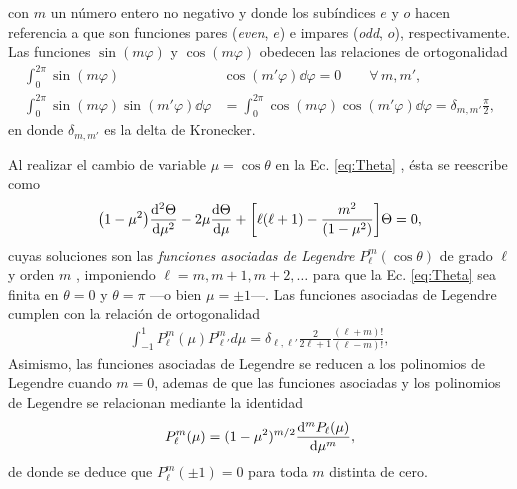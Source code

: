 \noindent con $m$ un número entero no negativo y donde los subíndices $e$ y $o$ hacen referencia a que son funciones pares (\emph{even}, $e$) e impares (\emph{odd}, $o$), respectivamente. Las funciones $\sin(m\varphi)$ y $\cos(m\varphi)$ obedecen las relaciones de ortogonalidad
 	\begin{subequations}
	\begin{align}
	\int_0^{2\pi} \sin(m\varphi) &\cos(m' \varphi) \dd\varphi = 0 \qquad \forall\, m,m',\label{seq:ortSinCos}\\
	\int_0^{2\pi} \sin(m\varphi) \sin(m'\varphi)\dd\varphi &=  \int_0^{2\pi} \cos(m\varphi) \cos(m'\varphi)\dd\varphi  = \delta_{m,m'}\frac{\pi}{2},\label{seq:ortCos2}
	\end{align}\label{eq:ortSinCos}
 	\end{subequations}
en donde $\delta_{m,m'}$ es la delta de Kronecker.

Al realizar el cambio de variable $\mu = \cos\theta$ en la Ec. \eqref{eq:Theta} , ésta se reescribe como
	\begin{align*}
	\qty(1-\mu^2) \dv[2]{\Theta}{\mu} - 2 \mu \dv{\Theta}{\mu} + \qty[\ell(\ell+1)-\frac{m^2}{(1-\mu^2)}]\Theta= 0,
	\end{align*}
\hspace{-.5em}cuyas soluciones son	las \emph{funciones asociadas de Legendre} $P_\ell^m(\cos\theta)$ de grado $\ell$ y orden $m$  \cite{arfken2001methods}, imponiendo $\ell = m, m+1,m+2,\ldots$ para  que la Ec. \eqref{eq:Theta} sea finita en $\theta = 0$ y $\theta = \pi$ ---o bien $\mu=\pm1$---. Las funciones asociadas de Legendre cumplen con la relación de ortogonalidad 
	\begin{align}
	\int_{-1}^1P_\ell^m(\mu) P_{\ell'}^md\mu = \delta_{\ell,\ell'}\frac{2}{2\ell+1}\frac{(\ell+m)!}{(\ell-m)!},
	\label{eq:ortLegendre}
	\end{align}
\hspace{-.5em}Asimismo, las funciones asociadas de Legendre se reducen a los polinomios de Legendre cuando $m=0$, ademas de que las funciones asociadas y los polinomios de Legendre se relacionan mediante la identidad  \cite{arfken2001methods}
	\begin{align}
	P_\ell^m (\mu) = (1-\mu^2)^{m/2}\dv[m]{P_\ell(\mu)}{\mu},
	\label{eq:Legendre}
	\end{align}
de donde se deduce  que $P_\ell^m(\pm 1)=0$ para toda $m$ distinta de cero.

